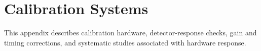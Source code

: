 \section{Calibration Systems}

This appendix describes calibration hardware, detector-response checks, gain and
timing corrections, and systematic studies associated with hardware response.
